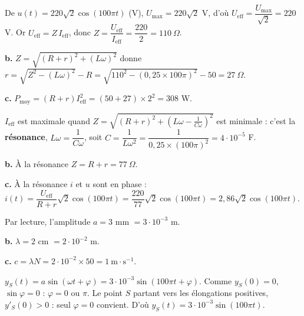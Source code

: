 \documentclass[11pt]{article}
\begin{document}

 De $u(t) = 220\sqrt{2}\cos(100\pi t)$ (V), $U_{\max} = 220\sqrt{2}$ V, d'où $U_{\text{eff}} = \dfrac{U_{\max}}{\sqrt{2}} = 220$ V. Or $U_{\text{eff}} = Z\,I_{\text{eff}}$, donc $Z = \dfrac{U_{\text{eff}}}{I_{\text{eff}}} = \dfrac{220}{2} = 110\ \Omega$.

\textbf{b.} $Z = \sqrt{(R + r)^2 + (L\omega)^2}$ donne $r = \sqrt{Z^2 - (L\omega)^2} - R = \sqrt{110^2 - (0{,}25\times 100\pi)^2} - 50 = 27\ \Omega$.

\textbf{c.} $P_{\text{moy}} = (R + r)I_{\text{eff}}^2 = (50 + 27)\times 2^2 = 308$ W.

 $I_{\text{eff}}$ est maximale quand $Z = \sqrt{(R+r)^2 + (L\omega - \frac{1}{C\omega})^2}$ est minimale : c'est la \textbf{résonance}, $L\omega = \dfrac{1}{C\omega}$, soit $C = \dfrac{1}{L\omega^2} = \dfrac{1}{0{,}25\times(100\pi)^2} = 4\cdot10^{-5}$ F.

\textbf{b.} À la résonance $Z = R + r = 77\ \Omega$.

\textbf{c.} À la résonance $i$ et $u$ sont en phase : $i(t) = \dfrac{U_{\text{eff}}}{R+r}\sqrt{2}\cos(100\pi t) = \dfrac{220}{77}\sqrt{2}\cos(100\pi t) = 2{,}86\sqrt{2}\cos(100\pi t)$.

\begin{center}
\end{center}

 Par lecture, l'amplitude $a = 3$ mm $= 3\cdot10^{-3}$ m.

\textbf{b.} $\lambda = 2$ cm $= 2\cdot10^{-2}$ m.

\textbf{c.} $c = \lambda N = 2\cdot10^{-2}\times 50 = 1\ \text{m}\cdot\text{s}^{-1}$.

 $y_S(t) = a\sin(\omega t + \varphi) = 3\cdot10^{-3}\sin(100\pi t + \varphi)$. Comme $y_S(0) = 0$, $\sin\varphi = 0$ : $\varphi = 0$ ou $\pi$. Le point $S$ partant vers les élongations positives, $y'_S(0) > 0$ : seul $\varphi = 0$ convient. D'où $y_S(t) = 3\cdot10^{-3}\sin(100\pi t)$.
\end{document}
